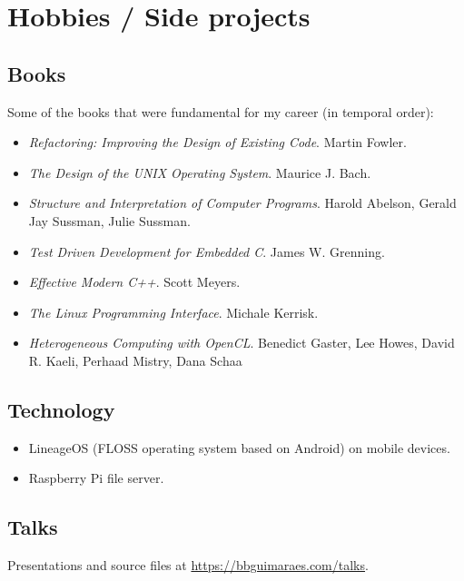 \section*{Hobbies / Side projects}
\subsection*{Books}

Some of the books that were fundamental for my career (in temporal order):

\begin{itemize}
    \item
        \textit{Refactoring: Improving the Design of Existing Code}.
        Martin Fowler.
    \item
        \textit{The Design of the UNIX Operating System}.
        Maurice J. Bach.
    \item
        \textit{Structure and Interpretation of Computer Programs}.
        Harold Abelson, Gerald Jay Sussman, Julie Sussman.
    \item
        \textit{Test Driven Development for Embedded C}.
        James W. Grenning.
    \item
        \textit{Effective Modern C++}.
        Scott Meyers.
    \item
        \textit{The Linux Programming Interface}.
        Michale Kerrisk.
    \item
        \textit{Heterogeneous Computing with OpenCL}.
        Benedict Gaster, Lee Howes, David R. Kaeli, Perhaad Mistry, Dana Schaa
\end{itemize}

\subsection*{Technology}

\begin{itemize}
    \item
        LineageOS (FLOSS operating system based on Android) on mobile devices.
    \item Raspberry Pi file server.
\end{itemize}

\subsection*{Talks}

Presentations and source files at \url{https://bbguimaraes.com/talks}.

